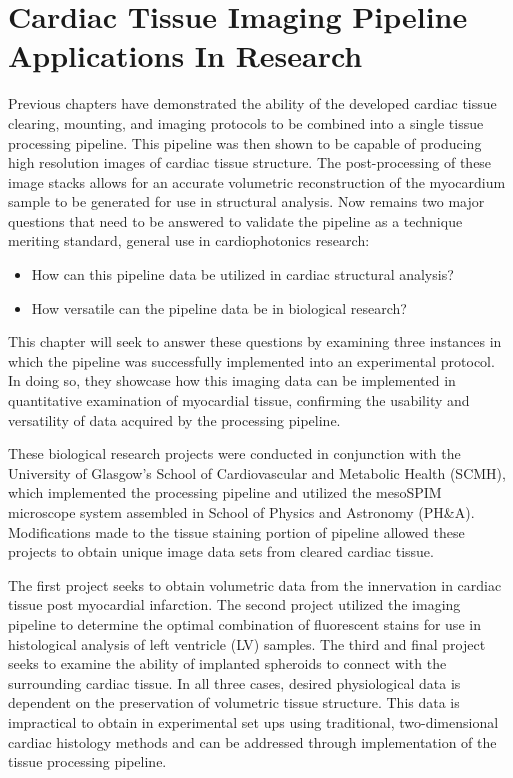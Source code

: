 \chapter{Cardiac Tissue Imaging Pipeline Applications In Research}

Previous chapters have demonstrated the ability of the developed cardiac tissue clearing, mounting, and imaging protocols to be combined into a single tissue processing pipeline. This pipeline was then shown to be capable of producing high resolution images of cardiac tissue structure. The post-processing of these image stacks allows for an accurate volumetric reconstruction of the myocardium sample to be generated for use in structural analysis. Now remains two major questions that need to be answered to validate the pipeline as a technique meriting standard, general use in cardiophotonics research: 
\begin{itemize}
    \item How can this pipeline data be utilized in cardiac structural analysis? 
    \item How versatile can the pipeline data be in biological research?
\end{itemize}

This chapter will seek to answer these questions by examining three instances in which the pipeline was successfully implemented into an experimental protocol. In doing so, they showcase how this imaging data can be implemented in quantitative examination of myocardial tissue, confirming the usability and versatility of data acquired by the processing pipeline.

These biological research projects were conducted in conjunction with the University of Glasgow’s School of Cardiovascular and Metabolic Health (SCMH), which implemented the processing pipeline and utilized the mesoSPIM microscope system assembled in School of Physics and Astronomy (PH\&A). Modifications made to the tissue staining portion of pipeline allowed these projects to obtain unique image data sets from cleared cardiac tissue. 

The first project seeks to obtain volumetric data from the innervation in cardiac tissue post myocardial infarction. The second project utilized the imaging pipeline to determine the optimal combination of fluorescent stains for use in histological analysis of left ventricle (LV) samples. The third and final project seeks to examine the ability of implanted spheroids to connect with the surrounding cardiac tissue. In all three cases, desired physiological data is dependent on the preservation of volumetric tissue structure. This data is impractical to obtain in experimental set ups using traditional, two-dimensional cardiac histology methods and can be addressed through implementation of the tissue processing pipeline.


